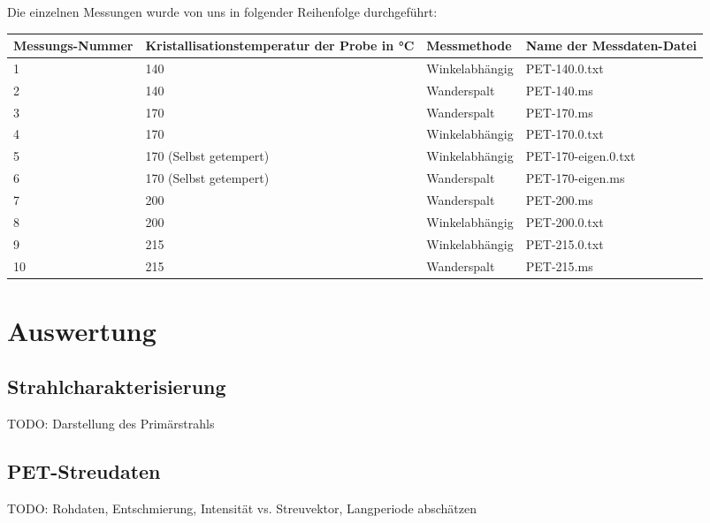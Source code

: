 \documentclass[bigchapter,colorback,accentcolor=tud4b,linedtoc,11pt]{tudreport}
\begin{document}
Die einzelnen Messungen wurde von uns in folgender Reihenfolge durchgeführt:


\begin{center}
  \begin{tabular}{|p{2.2cm}|p{4.5cm}|p{3cm}|p{4cm}|}
    \hline
    Messungs-Nummer & Kristallisationstemperatur der Probe in °C & Messmethode    & Name der Messdaten-Datei \\ \hline
    1               & 140                                        & Winkelabhängig & PET-140.0.txt \\ \hline
    2               & 140                                        & Wanderspalt    & PET-140.ms \\ \hline
    3               & 170                                        & Wanderspalt    & PET-170.ms \\ \hline
    4               & 170                                        & Winkelabhängig & PET-170.0.txt \\ \hline
    5               & 170 (Selbst getempert)                     & Winkelabhängig & PET-170-eigen.0.txt \\ \hline
    6               & 170 (Selbst getempert)                     & Wanderspalt    & PET-170-eigen.ms \\ \hline
    7               & 200                                        & Wanderspalt    & PET-200.ms \\ \hline
    8               & 200                                        & Winkelabhängig & PET-200.0.txt \\ \hline
    9               & 215                                        & Winkelabhängig & PET-215.0.txt \\ \hline
    10              & 215                                        & Wanderspalt    & PET-215.ms \\ \hline
	\end{tabular}
\end{center}

\chapter{Auswertung}
\section{Strahlcharakterisierung}
TODO: Darstellung des Primärstrahls

\section{PET-Streudaten}
TODO: Rohdaten, Entschmierung, Intensität vs. Streuvektor, Langperiode abschätzen
\end{document}
